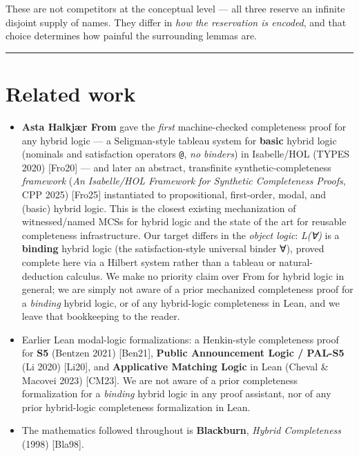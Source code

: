\documentclass[11pt,a4paper]{article}
\renewcommand{\_}{\origtextunderscore\allowbreak}
\begin{document}
These are not competitors at the conceptual level --- all three reserve an infinite disjoint supply of names. They differ in \emph{how the reservation is encoded}, and that choice determines how painful the surrounding lemmas are.

\begin{center}\rule{0.5\linewidth}{0.5pt}\end{center}

\hypertarget{related-work}{%
\section{Related work}\label{related-work}}

\begin{itemize}
\item
  \textbf{Asta Halkjær From} gave the \emph{first} machine-checked completeness proof for any hybrid logic --- a Seligman-style tableau system for \textbf{basic} hybrid logic (nominals and satisfaction operators \texttt{@}, \emph{no binders}) in Isabelle/HOL (TYPES 2020) {[}Fro20{]} --- and later an abstract, transfinite synthetic-completeness \emph{framework} (\emph{An Isabelle/HOL Framework for Synthetic Completeness Proofs}, CPP 2025) {[}Fro25{]} instantiated to propositional, first-order, modal, and (basic) hybrid logic. This is the closest existing mechanization of witnessed/named MCSs for hybrid logic and the state of the art for reusable completeness infrastructure. Our target differs in the \emph{object logic}: \emph{L(∀)} is a \textbf{binding} hybrid logic (the satisfaction-style universal binder ∀), proved complete here via a Hilbert system rather than a tableau or natural-deduction calculus. We make no priority claim over From for hybrid logic in general; we are simply not aware of a prior mechanized completeness proof for a \emph{binding} hybrid logic, or of any hybrid-logic completeness in Lean, and we leave that bookkeeping to the reader.
\item
  Earlier Lean modal-logic formalizations: a Henkin-style completeness proof for \textbf{S5} (Bentzen 2021) {[}Ben21{]}, \textbf{Public Announcement Logic / PAL-S5} (Li 2020) {[}Li20{]}, and \textbf{Applicative Matching Logic} in Lean (Cheval \& Macovei 2023) {[}CM23{]}. We are not aware of a prior completeness formalization for a \emph{binding} hybrid logic in any proof assistant, nor of any prior hybrid-logic completeness formalization in Lean.
\item
  The mathematics followed throughout is \textbf{Blackburn}, \emph{Hybrid Completeness} (1998) {[}Bla98{]}.
\end{itemize}
\end{document}
